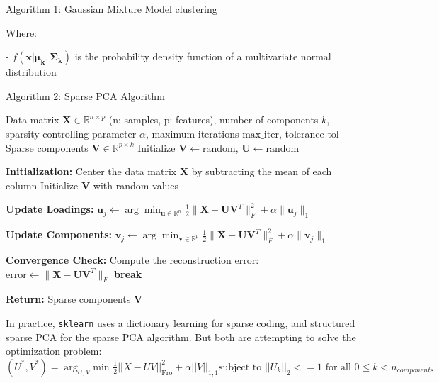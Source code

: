 \documentclass[12pt]{report} %
\begin{document}
\begin{definitionbox}{Algorithm 1: Gaussian Mixture Model clustering}
\begin{algorithmic}[1]
  \end{algorithmic}
  Where:

  - $f(\mathbf{x}|\mathbf{\mu_{k}}, \mathbf{\Sigma_{k}})$ is the probability density function of a multivariate normal distribution

  \label{alg:GMM}
\end{definitionbox}

\newpage

\begin{definitionbox}{Algorithm 2: Sparse PCA Algorithm}
  \begin{algorithmic}[1]
    \State Data matrix $\mathbf{X} \in \mathbb{R}^{n \times p}$ (n: samples, p: features), number of components $k$, sparsity controlling parameter $\alpha$, maximum iterations $\text{max\_iter}$, tolerance $\text{tol}$ 
    \State Sparse components $\mathbf{V} \in \mathbb{R}^{p \times k}$ 
    \State Initialize $\mathbf{V} \gets \text{random}$, $\mathbf{U} \gets \text{random}$ 

    \State \textbf{Initialization:}
    \State Center the data matrix $\mathbf{X}$ by subtracting the mean of each column
    \State Initialize $\mathbf{V}$ with random values

     
      \State \textbf{Update Loadings:}
       
        \State $\mathbf{u}_j \gets \arg \min_{\mathbf{u} \in \mathbb{R}^n} \frac{1}{2} \|\mathbf{X} - \mathbf{U} \mathbf{V}^T\|_F^2 + \alpha \|\mathbf{u}_j\|_1$
      \EndFor

      \State \textbf{Update Components:}
       
        \State $\mathbf{v}_j \gets \arg \min_{\mathbf{v} \in \mathbb{R}^p} \frac{1}{2} \|\mathbf{X} - \mathbf{U} \mathbf{V}^T\|_F^2 + \alpha \|\mathbf{v}_j\|_1$
      \EndFor

      \State \textbf{Convergence Check:}
      \State Compute the reconstruction error: $\text{error} \gets \|\mathbf{X} - \mathbf{U} \mathbf{V}^T\|_F$
        \State \textbf{break}
      \EndIf
    \EndFor

    \State \textbf{Return:} Sparse components $\mathbf{V}$

  \end{algorithmic}
  In practice, \texttt{sklearn} uses a dictionary learning for sparse coding\cite{mairal2010online}, and structured sparse PCA\cite{jenatton2010structured} for the sparse PCA algorithm. But both are attempting to solve the optimization problem: $(U^*, V^*) = \arg_{U, V} \text{min } \frac{1}{2} ||X-UV||_{\text{Fro}}^2+\alpha||V||_{1,1} \text{subject to } ||U_k||_2 <= 1 \text{ for all } 0 \leq k < n_{components}$
  \label{alg:SPCA}
\end{definitionbox}
\end{document}
